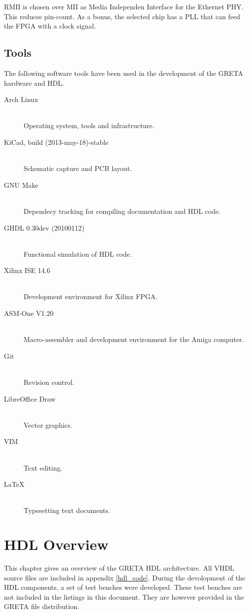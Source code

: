 \documentclass[a4paper]{report}
\begin{document}
RMII is chosen over MII as Media Independen Interface for the
Ethernet PHY. This reduces pin-count. As a bonus, the selected
chip has a PLL that can feed the FPGA with a clock signal.

\section{Tools}
The following software tools have been used in the development
of the GRETA hardware and HDL.
\begin{description}
  \item[Arch Linux] \hfill \\
  Operating system, tools and infrastructure.
  \item[KiCad, build (2013-may-18)-stable] \hfill \\
  Schematic capture and PCB layout.
  \item[GNU Make] \hfill \\
  Dependecy tracking for compiling documentation and HDL code.
  \item[GHDL 0.30dev (20100112)] \hfill \\
  Functional simulation of HDL code.
  \item[Xilinx ISE 14.6] \hfill \\
  Development environment for Xilinx FPGA.
  \item[ASM-One V1.20] \hfill \\
  Macro-assembler and development environment for the Amiga computer.
  \item[Git] \hfill \\
  Revision control.
  \item[LibreOffice Draw] \hfill \\
  Vector graphics.
  \item[VIM] \hfill \\
  Text editing.
  \item[\LaTeX] \hfill \\
  Typesetting text documents.
\end{description}

\chapter{HDL Overview}
This chapter gives an overview of the GRETA HDL architecture.
All VHDL source files are included in appendix \ref{hdl_code}.
During the devolopment of the HDL components, a set of test
benches were developed. These test benches are not included
in the listings in this document. They are however provided
in the GRETA file distribution.
\end{document}
